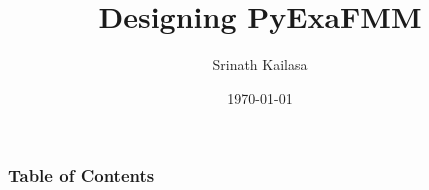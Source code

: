\documentclass{beamer}
\title{Designing PyExaFMM}
\author{Srinath Kailasa}
\institute{Department of Mathematics\\University College London}
\date{\today}
\begin{document}
\frame{\titlepage}

\begin{frame}
\frametitle{Table of Contents}
\tableofcontents
\end{frame}




\end{document}

